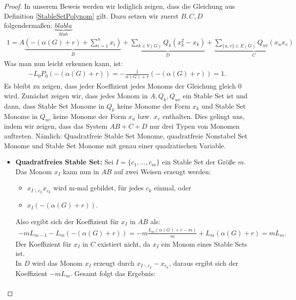 \begin{proof}
In unserem Beweis werden wir lediglich zeigen, dass die Gleichung aus Definition \ref{StableSetPolynom} gilt. Dazu setzen wir zuerst $B,C,D$ folgendermaßen:
$\underbrace{blabla}_{blub}$
\begin{align*}
1 = A\underbrace{\left(-(\alpha(G) + r) + \sum_{i=1}^nx_i\right)}_{B}+\underbrace{\sum_{k \in V(G)} Q_k(x_k^2-x_k)}_{D}+\underbrace{\sum_{\{u,v\}\in E(G)} Q_{uv}(x_ux_v)}_{C}
\end{align*}
Was man nun leicht erkennen kann, ist:
\begin{align*}
-L_0P_0\left(-(\alpha(G)+r)\right) = - \frac{1}{\alpha(G)+r}\left(-(\alpha(G)+r)\right) = 1.
\end{align*}
Es bleibt zu zeigen, dass jeder Koeffizient jedes Monoms der Gleichung gleich $0$ wird. Zunächst zeigen wir, dass jedes Monom in $A,Q_k,Q_{uv}$ ein Stable Set ist und dann, dass Stable Set Monome in $Q_k$ keine Monome der Form $x_k$ und Stable Set Monome in $Q_{uv}$ keine Monome der Form $x_u$ bzw. $x_v$ enthalten. Dies gelingt uns, indem wir zeigen, dass das System $AB+C+D$  nur drei Typen von Monomen auftreten. Nämlich: Quadratfreie Stable Set Monome, quadratfreie Nonstabel Set Monome und Stable Set Monome mit genau einer quadratischen Variable.\\
\begin{itemize}
\item \textbf{Quadratfreies Stable Set:} Sei $I=\{c_1,\ldots,c_m\}$ ein Stable Set der Größe $m$. Das Monom $x_I$ kann nun in $AB$ auf zwei Weisen erzeugt werden:\\
\begin{itemize}
\item $x_{I\backslash c_k}x_{c_k}$ wird m-mal gebildet, für jedes $c_k$ einmal, oder
\item $x_I\left(-(\alpha(G)+r)\right)$.
\end{itemize}
Also ergibt sich der Koeffizient für $x_I$ in \textbf{$AB$} als:
\begin{align*}
-mL_{m-1}-L_m\left(-(\alpha(G)+r)\right) = -m \frac{L_m(\alpha(G)+r-m)}{m} + L_m(\alpha(G)+r) = mL_m.
\end{align*}
Der Koeffizient für $x_I$ in \textbf{$C$} existiert nicht, da $x_I$ ein Monom eines Stable Sets ist.\\
In \textbf{$D$} wird das Monom $x_I$ erzeugt durch $x_{I\backslash c_k}-x_{c_k}$, daraus ergibt sich der Koeffizient $-mL_m$. Gesamt folgt das Ergebnis:
\begin{align*}

\end{align*}
\end{itemize}
\end{proof}
